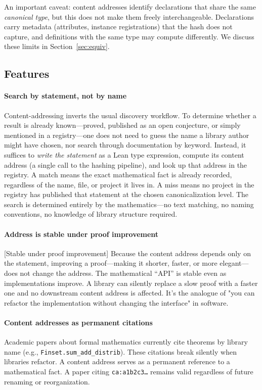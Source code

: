 An important caveat: content addresses identify declarations that share
the same \emph{canonical type}, but this does not make them freely
interchangeable.  Declarations carry metadata (attributes, instance
registrations) that the hash does not capture, and definitions with the
same type may compute differently.  We discuss these limits in
Section~\ref{sec:equiv}.

\subsection{Features}

  \paragraph{Search by statement, not by name}
  \label{rem:search}
  Content-addressing inverts the usual discovery workflow.  To determine
  whether a result is already known---proved, published as an open
  conjecture, or simply mentioned in a registry---one does not need to
  guess the name a library author might have chosen, nor search through
  documentation by keyword.  Instead, it suffices to \emph{write the
  statement} as a Lean type expression, compute its content address
  (a single call to the hashing pipeline), and look up that address
  in the registry.  A match means the exact mathematical fact is already
  recorded, regardless of the name, file, or project it lives in.
  A miss means no project in the registry has published that statement
  at the chosen canonicalization level.  The search is determined
  entirely by the mathematics---no text matching, no naming conventions,
  no knowledge of library structure required.

  \paragraph{Address is stable under proof improvement}
  [Stable under proof improvement]
  \label{rem:proof-improvement}
  Because the content address depends only on the statement, improving a
  proof---making it shorter, faster, or more elegant---does not change
  the address.  The mathematical ``API'' is stable even as
  implementations improve.  A library can silently replace a slow proof
  with a faster one and no downstream content address is affected.
  It's the analogue of "you can refactor the implementation without changing the interface" in software.

  \paragraph{Content addresses as permanent citations}
  \label{rem:citations}
  Academic papers about formal mathematics currently cite theorems by
  library name (e.g., \texttt{Finset.sum\_add\_distrib}).  These
  citations break silently when libraries refactor.  A content address
  serves as a permanent reference to a mathematical fact.
  A paper citing \texttt{ca:a1b2c3\ldots} remains
  valid regardless of future renaming or reorganization.

